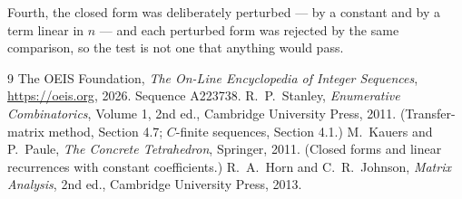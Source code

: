 \documentclass[11pt,a4paper]{article}
\theoremstyle{plain}
\theoremstyle{definition}
\begin{document}
Fourth, the closed form was deliberately perturbed --- by a constant and by a term linear in
$n$ --- and each perturbed form was rejected by the same comparison, so the test is not one
that anything would pass.

\begin{thebibliography}{9}
 The OEIS Foundation, \emph{The On-Line Encyclopedia of Integer
Sequences}, \url{https://oeis.org}, 2026. Sequence A223738.
 R.~P.~Stanley, \emph{Enumerative Combinatorics}, Volume 1, 2nd ed.,
Cambridge University Press, 2011. (Transfer-matrix method, Section 4.7; $C$-finite sequences,
Section 4.1.)
 M.~Kauers and P.~Paule, \emph{The Concrete Tetrahedron}, Springer, 2011.
(Closed forms and linear recurrences with constant coefficients.)
 R.~A.~Horn and C.~R.~Johnson, \emph{Matrix Analysis}, 2nd ed., Cambridge
University Press, 2013.
\end{thebibliography}
\end{document}
